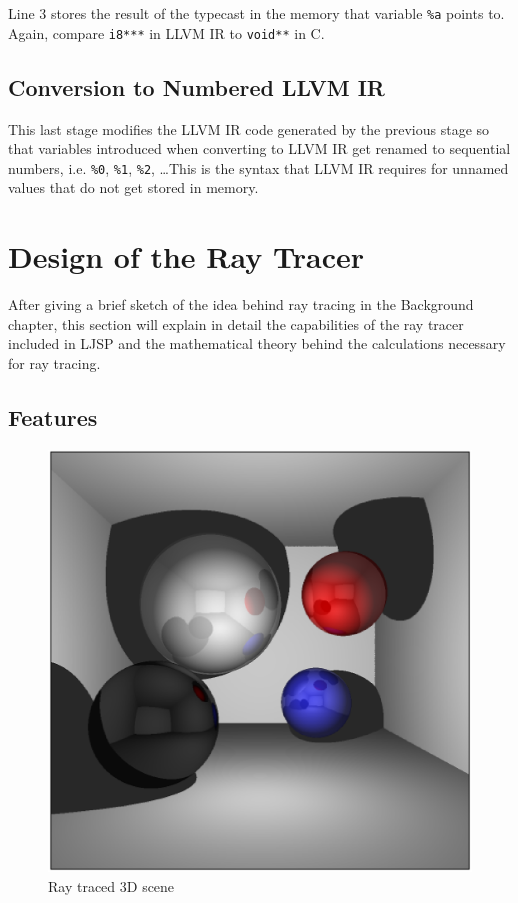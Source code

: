 \documentclass[11pt]{report}
\begin{document}
Line 3 stores the result of the typecast in the memory that variable \texttt{\%a} points to. Again, compare \texttt{i8***} in LLVM IR to \texttt{void**} in C.

\subsection{Conversion to Numbered LLVM IR}
This last stage modifies the LLVM IR code generated by the previous stage so that variables introduced when converting to LLVM IR get renamed to sequential numbers, i.e. \texttt{\%0}, \texttt{\%1}, \texttt{\%2}, \dots This is the syntax that LLVM IR requires for unnamed values that do not get stored in memory.

\section{Design of the Ray Tracer}
After giving a brief sketch of the idea behind ray tracing in the Background chapter, this section will explain in detail the capabilities of the ray tracer included in LJSP and the mathematical theory behind the calculations necessary for ray tracing.

\subsection{Features}

\begin{figure}%
\begin{center}
\includegraphics[scale=0.7]{raytracerscreenshot.eps}
\caption{Ray traced 3D scene}
\end{center}
\label{raytracerscreenshot}
\end{figure}
\end{document}
